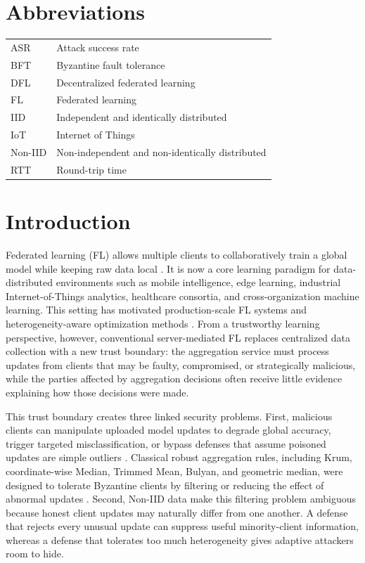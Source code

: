 \documentclass[preprint,12pt]{elsarticle}
\begin{document}
\section*{Abbreviations}

\begin{tabular}{ll}
ASR & Attack success rate \\
BFT & Byzantine fault tolerance \\
DFL & Decentralized federated learning \\
FL & Federated learning \\
IID & Independent and identically distributed \\
IoT & Internet of Things \\
Non-IID & Non-independent and non-identically distributed \\
RTT & Round-trip time \\
\end{tabular}

\section{Introduction}

Federated learning (FL) allows multiple clients to collaboratively train a global model while keeping raw data local \citep{mcmahan2017fedavg,kairouz2021advances}. It is now a core learning paradigm for data-distributed environments such as mobile intelligence, edge learning, industrial Internet-of-Things analytics, healthcare consortia, and cross-organization machine learning. This setting has motivated production-scale FL systems and heterogeneity-aware optimization methods \citep{bonawitz2019scale,li2020fedprox,karimireddy2020scaffold,reddi2021fedopt}. From a trustworthy learning perspective, however, conventional server-mediated FL replaces centralized data collection with a new trust boundary: the aggregation service must process updates from clients that may be faulty, compromised, or strategically malicious, while the parties affected by aggregation decisions often receive little evidence explaining how those decisions were made.

This trust boundary creates three linked security problems. First, malicious clients can manipulate uploaded model updates to degrade global accuracy, trigger targeted misclassification, or bypass defenses that assume poisoned updates are simple outliers \citep{fang2020local,bagdasaryan2020backdoor,baruch2019little,cao2021fltrust}. Classical robust aggregation rules, including Krum, coordinate-wise Median, Trimmed Mean, Bulyan, and geometric median, were designed to tolerate Byzantine clients by filtering or reducing the effect of abnormal updates \citep{blanchard2017krum,yin2018byzantine,elmhamdi2018bulyan,pillutla2022rfa}. Second, Non-IID data make this filtering problem ambiguous because honest client updates may naturally differ from one another. A defense that rejects every unusual update can suppress useful minority-client information, whereas a defense that tolerates too much heterogeneity gives adaptive attackers room to hide.
\end{document}
